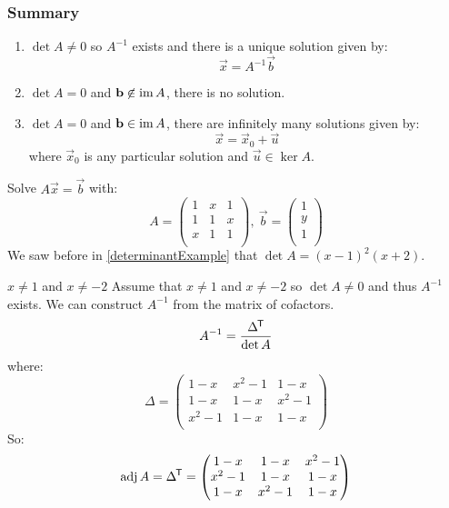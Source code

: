 \documentclass[../main.tex]{subfiles}
\begin{document}
\subsubsection{Summary}
\begin{enumerate}
  \item $\det A \neq 0$ so $A^{-1}$ exists and there is a unique solution given by:
    \[
      \vec{x} = A^{-1}\vec{b}
    \]
  \item $\det A = 0$ and $\vec{b} \centernot\in \im A$, there is no solution.
  \item $\det A = 0$ and $\mathbf{\bm{b}} \in \operatorname{im} A$, there are infinitely many solutions given by:
    \[
      \vec{x} = \vec{x}_0 + \vec{u}
    \]
    where $\vec{x}_0$ is any particular solution and $\vec{u} \in \ker A$.
\end{enumerate}
\begin{example}
  Solve $A\vec{x} = \vec{b}$ with:
  \[
    A = \begin{pmatrix}
    1 & x & 1 \\
    1 & 1 & x \\
    x & 1 & 1 \\
    \end{pmatrix},\
    \vec{b} = \begin{pmatrix}
    1 \\
    y \\
    1 \\
    \end{pmatrix}
  \]
  We saw before in \cref{determinantExample} that $\det A = (x - 1)^2(x + 2)$.
  \begin{proofcases}
    \begin{case}{$x \neq 1$ and $x \neq -2$}
      Assume that $x \neq 1$ and $x \neq -2$ so $\det A \neq 0$ and thus $A^{-1}$ exists.
      We can construct $A^{-1}$ from the matrix of cofactors.
      \[
        A^{-1} = \frac{\Delta^{{\mkern-1.5mu\mathsf{T}}}}{\det A}
      \]
      where:
      \[
        \Delta = \begin{pmatrix}
        1 - x & x^2 - 1 & 1 - x \\
        1 - x & 1 - x & x^2 - 1 \\
        x^2 - 1 & 1 - x & 1 - x \\
        \end{pmatrix}
      \]
      So:
      \[
        \operatorname{adj} A = \Delta^{{\mkern-1.5mu\mathsf{T}}} = \begin{pmatrix}
        1-x & 1-x & x^2-1 \\
        x^2-1 & 1-x & 1-x \\
        1-x & x^2 -1 & 1-x \\

\end{pmatrix}\]
\end{case}
\end{proofcases}
\end{example}
\end{document}
